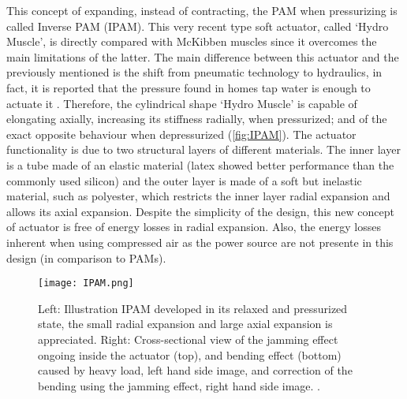 This concept of expanding, instead of contracting, the PAM when pressurizing is called Inverse PAM (IPAM). This very recent type soft actuator, called `Hydro Muscle', is directly compared with McKibben muscles since it overcomes the main limitations of the latter. The main difference between this actuator and the previously mentioned is the shift from pneumatic technology to hydraulics, in fact, it is reported that the pressure found in homes tap water is enough to actuate it \cite{Sridar2016}. Therefore, the cylindrical shape `Hydro Muscle' is capable of elongating axially, increasing its stiffness radially, when pressurized; and of the exact opposite behaviour when depressurized (\autoref{fig:IPAM}). The actuator functionality is due to two structural layers of different materials. The inner layer is a tube made of an elastic material (latex showed better performance than the commonly used silicon) and the outer layer is made of a soft but inelastic material, such as polyester, which restricts the inner layer radial expansion and allows its axial expansion. Despite the simplicity of the design, this new concept of actuator is free of energy losses in radial expansion. Also, the energy losses inherent when using compressed air as the power source are not presente in this design (in comparison to PAMs).
\begin{figure}[hbtp!]
    \centering
    \texttt{[image: IPAM.png]}
    \caption{Left: Illustration IPAM developed in its relaxed and pressurized state, the small radial expansion and large axial expansion is appreciated. Right: Cross-sectional view of the jamming effect ongoing inside the actuator (top), and bending effect (bottom) caused by heavy load, left hand side image, and correction of the bending using the jamming effect, right hand side image. \cite{Sridar2016}. }
    \label{fig:IPAM}
\end{figure}

